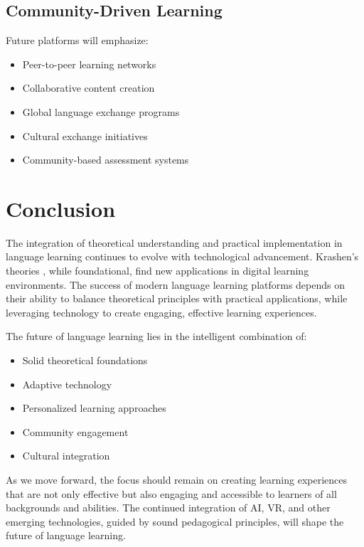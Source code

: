 \subsection{Community-Driven Learning}
Future platforms will emphasize:
\begin{itemize}
    \item Peer-to-peer learning networks
    \item Collaborative content creation
    \item Global language exchange programs
    \item Cultural exchange initiatives
    \item Community-based assessment systems
\end{itemize}

\section{Conclusion}
The integration of theoretical understanding and practical implementation in language learning continues to evolve with technological advancement. Krashen's theories \citep{krashen2013second}, while foundational, find new applications in digital learning environments. The success of modern language learning platforms depends on their ability to balance theoretical principles with practical applications, while leveraging technology to create engaging, effective learning experiences.

The future of language learning lies in the intelligent combination of:
\begin{itemize}
    \item Solid theoretical foundations
    \item Adaptive technology
    \item Personalized learning approaches
    \item Community engagement
    \item Cultural integration
\end{itemize}

As we move forward, the focus should remain on creating learning experiences that are not only effective but also engaging and accessible to learners of all backgrounds and abilities. The continued integration of AI, VR, and other emerging technologies, guided by sound pedagogical principles, will shape the future of language learning. 